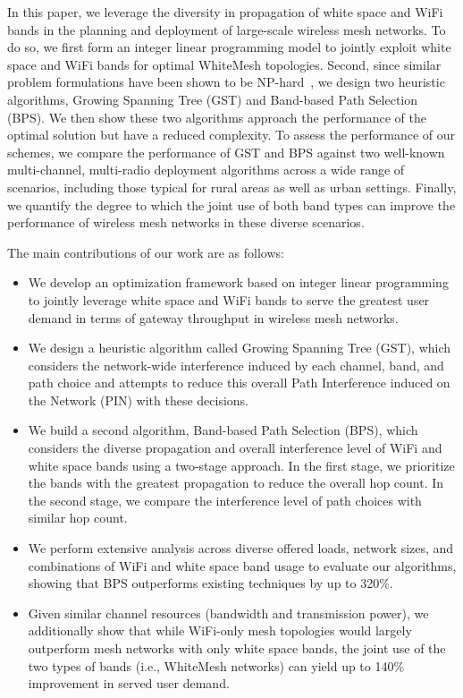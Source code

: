 In this paper, we leverage the diversity in propagation of
white space and WiFi bands in the planning and deployment
of large-scale wireless mesh networks. To do so, we first form an
integer linear programming model to jointly exploit 
white space and WiFi bands for optimal WhiteMesh topologies.
Second, since similar problem formulations have been shown to be 
NP-hard~\cite{jain2005impact}, we design two heuristic algorithms, 
Growing Spanning Tree (GST) and Band-based Path Selection (BPS). We then
show these two algorithms approach the performance of the 
optimal solution but have a reduced complexity. To assess the 
performance of our schemes, we compare the performance of GST and 
BPS against two well-known multi-channel, multi-radio deployment 
algorithms across a wide range of scenarios, including those
typical for rural areas as well as urban settings. Finally, we
quantify the degree to which the joint use of both band types can improve the 
performance of wireless mesh networks in these diverse scenarios.

The main contributions of our work are as follows:
\begin{itemize}
\item We develop an optimization framework based on integer
linear programming to jointly leverage white space and WiFi bands
to serve the greatest user demand in terms of gateway throughput 
in wireless mesh networks.  
\item We design a heuristic algorithm called Growing Spanning Tree (GST), which considers the network-wide interference induced by each channel, band, and path choice and attempts to reduce this overall Path Interference induced on the Network (PIN) with these decisions.
\item We build a second algorithm, Band-based Path 
Selection (BPS), which considers the diverse propagation 
and overall interference level of WiFi and white space bands using
a two-stage approach.  In the first stage, we prioritize the bands
with the greatest propagation to reduce the overall hop count. In the
second stage, we compare the interference level of path choices with
similar hop count. 
\item We perform extensive analysis across diverse offered loads,
network sizes, and combinations of WiFi and white space band usage
to evaluate our algorithms, showing that BPS outperforms existing
techniques by up to 320\%.  
\item Given similar channel resources
(bandwidth and transmission power), we additionally show that while
WiFi-only mesh topologies would largely outperform mesh networks with only
white space bands, the joint use of the two types of bands (i.e., WhiteMesh 
networks) can yield up to 140\% improvement in served user demand.
\end{itemize}

